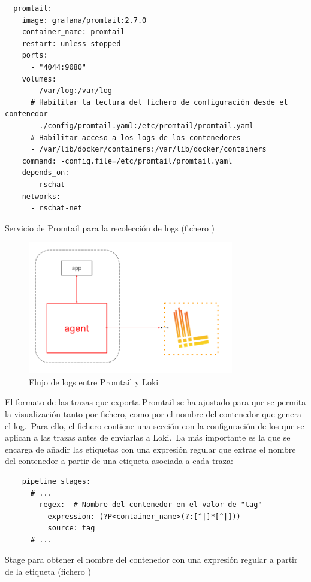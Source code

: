 \begin{codeBlock}
	\begin{verbatim}
  promtail:
    image: grafana/promtail:2.7.0
    container_name: promtail
    restart: unless-stopped
    ports:
      - "4044:9080"
    volumes:
      - /var/log:/var/log
      # Habilitar la lectura del fichero de configuración desde el contenedor
      - ./config/promtail.yaml:/etc/promtail/promtail.yaml
      # Habilitar acceso a los logs de los contenedores
      - /var/lib/docker/containers:/var/lib/docker/containers
    command: -config.file=/etc/promtail/promtail.yaml
    depends_on:
      - rschat
    networks:
      - rschat-net
	\end{verbatim}
	\caption{Servicio de Promtail para la recolección de logs (fichero )}
\end{codeBlock}
\label{cod:promtail-docker-compose}

\begin{figure}[ht]
	\centering
	\includegraphics[width=0.8\textwidth]{res/images/loki-promtail-architecture}
	\caption{Flujo de logs entre Promtail y Loki}
	\label{fig:promtail}
\end{figure}

El formato de las trazas que exporta Promtail se ha ajustado para que se permita la visualización tanto por fichero,
como por el nombre del contenedor que genera el log.\ Para ello, el fichero 
contiene una sección  con la configuración de los  que se aplican a las
trazas antes de enviarlas a Loki.\ La más importante es la que se encarga de añadir las etiquetas
 con una expresión regular que extrae el nombre del contenedor a partir de una etiqueta
asociada a cada traza:

\begin{codeBlock}
	\begin{verbatim}
    pipeline_stages:
      # ...
      - regex:  # Nombre del contenedor en el valor de "tag"
          expression: (?P<container_name>(?:[^|]*[^|]))
          source: tag
      # ...
	\end{verbatim}
	\caption{Stage para obtener el nombre del contenedor con una expresión regular a partir de la etiqueta
	 (fichero )}
\end{codeBlock}
\label{cod:promtail-regexp-container-name}

